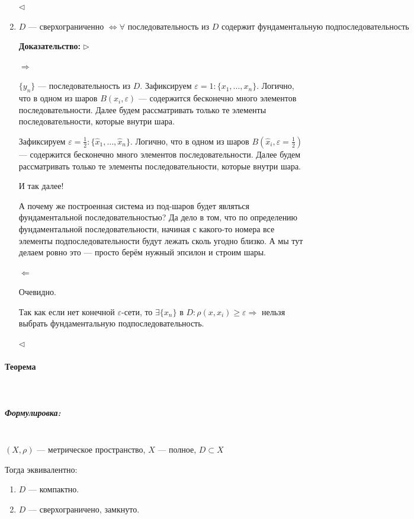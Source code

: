 \documentclass{article}
\let\vanillaparagraph\paragraph
\let\vanillasubparagraph\subparagraph
\renewcommand{\paragraph}[1]{\vanillaparagraph{#1}\mbox{}\\}
\renewcommand{\subparagraph}[1]{\vanillasubparagraph{#1}\mbox{}\\}
\begin{document}
\begin{enumerate}
    $\lhd$

    
    \item $D\text{ --- сверхограниченно }\Leftrightarrow \forall\text{ последовательность из $D$ содержит фундаментальную подпоследовательность}$
    
  \textbf{Доказательство:}
    $\rhd$
    
    $\Rightarrow$
    
    $\{y_n\}$ --- последовательность из $D$. Зафиксируем $\varepsilon = 1 : \{x_1, \ldots, x_n\}$. Логично, что в одном из шаров $B(x_i, \varepsilon)$ --- содержится бесконечно много элементов последовательности. Далее будем рассматривать только те элементы последовательности, которые внутри шара.
    
    Зафиксируем $\varepsilon = \frac{1}{2} : \{\hat{x}_1, \ldots, \hat{x}_n\}$. Логично, что в одном из шаров $B(\hat{x}_i, \varepsilon = \frac{1}{2})$ --- содержится бесконечно много элементов последовательности. Далее будем рассматривать только те элементы последовательности, которые внутри шара.
    
    И так далее!
    
    А почему же построенная система из под-шаров будет являться фундаментальной последовательностью? Да дело в том, что по определению фундаментальной последовательности, начиная с какого-то номера все элементы подпоследовательности будут лежать сколь угодно близко. А мы тут делаем ровно это --- просто берём нужный эпсилон и строим шары.
    
    $\Leftarrow$
    
    Очевидно. \Smiley
    
    Так как если нет конечной $\varepsilon$-сети, то $\exists \{x_n\}$ в $D : \rho(x, x_i) \ge \varepsilon \Rightarrow$ нельзя выбрать фундаментальную подпоследовательность. 

    $\lhd$
\end{enumerate}

\paragraph{Теорема}

\subparagraph{Формулировка:}

$(X, \rho)$ --- метрическое пространство, $X$ --- полное, $D \subset X$

Тогда эквивалентно:

\begin{enumerate}
    \item $D$ --- компактно.
    \item $D$ --- сверхограничено, замкнуто.
\end{enumerate}
\end{document}
